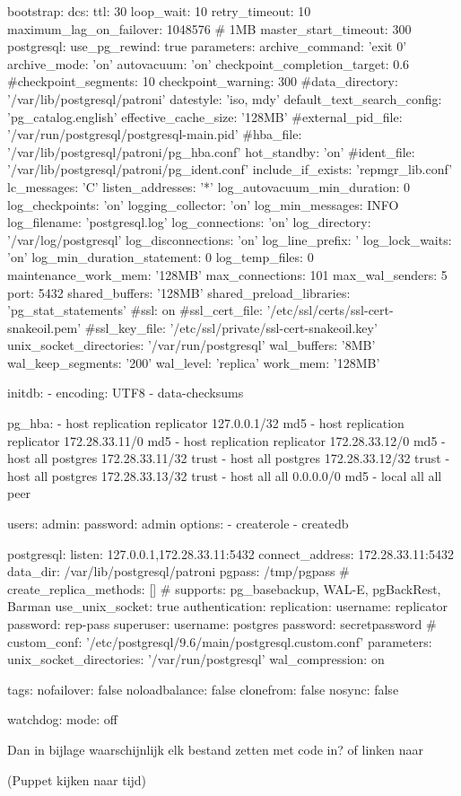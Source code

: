 bootstrap:
dcs:
ttl: 30
loop_wait: 10
retry_timeout: 10
maximum_lag_on_failover: 1048576 # 1MB
master_start_timeout: 300
postgresql:
use_pg_rewind: true
parameters:
archive_command: 'exit 0'
archive_mode: 'on'
autovacuum: 'on'
checkpoint_completion_target: 0.6
#checkpoint_segments: 10
checkpoint_warning: 300
#data_directory: '/var/lib/postgresql/patroni'
datestyle: 'iso, mdy'
default_text_search_config: 'pg_catalog.english'
effective_cache_size: '128MB'
#external_pid_file: '/var/run/postgresql/postgresql-main.pid'
#hba_file: '/var/lib/postgresql/patroni/pg_hba.conf'
hot_standby: 'on'
#ident_file: '/var/lib/postgresql/patroni/pg_ident.conf'
include_if_exists: 'repmgr_lib.conf'
lc_messages: 'C'
listen_addresses: '*'
log_autovacuum_min_duration: 0
log_checkpoints: 'on'
logging_collector: 'on'
log_min_messages: INFO
log_filename: 'postgresql.log'
log_connections: 'on'
log_directory: '/var/log/postgresql'
log_disconnections: 'on'
log_line_prefix: '%
log_lock_waits: 'on'
log_min_duration_statement: 0
log_temp_files: 0
maintenance_work_mem: '128MB'
max_connections: 101
max_wal_senders: 5
port: 5432
shared_buffers: '128MB'
shared_preload_libraries: 'pg_stat_statements'
#ssl: on
#ssl_cert_file: '/etc/ssl/certs/ssl-cert-snakeoil.pem'
#ssl_key_file: '/etc/ssl/private/ssl-cert-snakeoil.key'
unix_socket_directories: '/var/run/postgresql'
wal_buffers: '8MB'
wal_keep_segments: '200'
wal_level: 'replica'
work_mem: '128MB'

initdb:
- encoding: UTF8
- data-checksums

pg_hba:
- host replication replicator 127.0.0.1/32 md5
- host replication replicator 172.28.33.11/0 md5
- host replication replicator 172.28.33.12/0 md5
- host all postgres 172.28.33.11/32 trust
- host all postgres 172.28.33.12/32 trust
- host all postgres 172.28.33.13/32 trust
- host all all 0.0.0.0/0 md5
- local all all peer

users:
admin:
password: admin
options:
- createrole
- createdb

postgresql:
listen: 127.0.0.1,172.28.33.11:5432
connect_address: 172.28.33.11:5432
data_dir: /var/lib/postgresql/patroni
pgpass: /tmp/pgpass
#    create_replica_methods: [] # supports: pg_basebackup, WAL-E, pgBackRest, Barman
use_unix_socket: true
authentication:
replication:
username: replicator
password: rep-pass
superuser:
username: postgres
password: secretpassword
#    custom_conf: '/etc/postgresql/9.6/main/postgresql.custom.conf'
parameters:
unix_socket_directories: '/var/run/postgresql'
wal_compression: on

tags:
nofailover: false
noloadbalance: false
clonefrom: false
nosync: false

watchdog:
mode: off



Dan in bijlage waarschijnlijk elk bestand zetten met code in?
of linken naar 




(Puppet kijken naar tijd)
